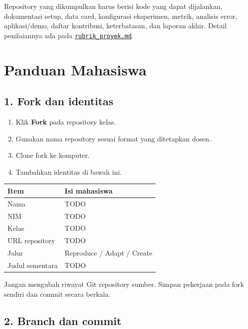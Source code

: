 \documentclass[
  indonesian,
  letterpaper,
  DIV=11,
  numbers=noendperiod]{scrreprt}
\newcounter{none} %
\providecommand{\tightlist}{%
  \setlength{\itemsep}{0pt}\setlength{\parskip}{0pt}}
\begin{document}
Repository yang dikumpulkan harus berisi kode yang dapat dijalankan,
dokumentasi setup, data card, konfigurasi eksperimen, metrik, analisis
error, aplikasi/demo, daftar kontribusi, keterbatasan, dan laporan
akhir. Detail penilaiannya ada pada
\href{rubrik_proyek.md}{\texttt{rubrik\_proyek.md}}.


\chapter{Panduan Mahasiswa}\label{panduan-mahasiswa}

\section{1. Fork dan identitas}\label{fork-dan-identitas}

\begin{enumerate}
\def\labelenumi{\arabic{enumi}.}
\tightlist
\item
  Klik \textbf{Fork} pada repository kelas.
\item
  Gunakan nama repository sesuai format yang ditetapkan dosen.
\item
  Clone fork ke komputer.
\item
  Tambahkan identitas di bawah ini.
\end{enumerate}

{\def\LTcaptype{none} %
\begin{longtable}[]{@{}ll@{}}
\toprule\noalign{}
Item & Isi mahasiswa \\
\midrule\noalign{}
\endhead
\bottomrule\noalign{}
\endlastfoot
Nama & TODO \\
NIM & TODO \\
Kelas & TODO \\
URL repository & TODO \\
Jalur & Reproduce / Adapt / Create \\
Judul sementara & TODO \\
\end{longtable}
}

Jangan mengubah riwayat Git repository sumber. Simpan pekerjaan pada
fork sendiri dan commit secara berkala.

\section{2. Branch dan commit}\label{branch-dan-commit}
\end{document}
